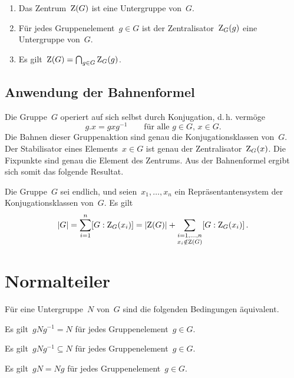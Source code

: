 \begin{proposition}
  \leavevmode
  \begin{enumerate}
    \item
      Das Zentrum~$\operatorname{Z}(G)$ ist eine Untergruppe von~$G$.
    \item
      Für jedes Gruppenelement~$g \in G$ ist der Zentralisator~$\operatorname{Z}_G(g)$ eine Untergruppe von~$G$.
    \item
      Es gilt~$\operatorname{Z}(G) = \bigcap_{g \in G} \operatorname{Z}_G(g)$.
  \end{enumerate}
\end{proposition}



\subsection{Anwendung der Bahnenformel}

Die Gruppe~$G$ operiert auf sich selbst durch Konjugation, d.\,h. vermöge
\[
  g.x = g x g^{-1}
  \qquad
  \text{für alle~$g \in G$,~$x \in G$.}
\]
Die Bahnen dieser Gruppenaktion sind genau die Konjugationsklassen von~$G$.
Der Stabilisator eines Elements~$x \in G$ ist genau der Zentralisator~$\operatorname{Z}_G(x)$.
Die Fixpunkte sind genau die Element des Zentrums.
Aus der Bahnenformel ergibt sich somit das folgende Resultat.

\begin{theorem}[Klassenformel]
  Die Gruppe~$G$ sei endlich, und seien~$x_1, \dotsc, x_n$ ein Repräsentantensystem der Konjugationsklassen von~$G$.
  Es gilt
  \[
    \lvert G\rvert
    =
    \sum_{i=1}^n [G : \operatorname{Z}_G(x_i)]
    =
    \lvert \operatorname{Z}(G) \rvert
    +
    \sum_{\substack{i = 1, \dotsc, n \\ x_i \notin \operatorname{Z}(G)}}
    [G : \operatorname{Z}_G(x_i)] \,.
  \]
\end{theorem}



\section{Normalteiler}

\begin{proposition}
  \label{characterizations of normal subgroups}
  Für eine Untergruppe~$N$ von~$G$ sind die folgenden Bedingungen äquivalent.
  \begin{equivlist}
    \item
      Es gilt~$g N g^{-1} = N$ für jedes Gruppenelement~$g \in G$.
    \item
      Es gilt~$g N g^{-1} \subseteq N$ für jedes Gruppenelement~$g \in G$.
    \item
      Es gilt~$gN = Ng$ für jedes Gruppenelement~$g \in G$.
  \end{equivlist}
\end{proposition}

